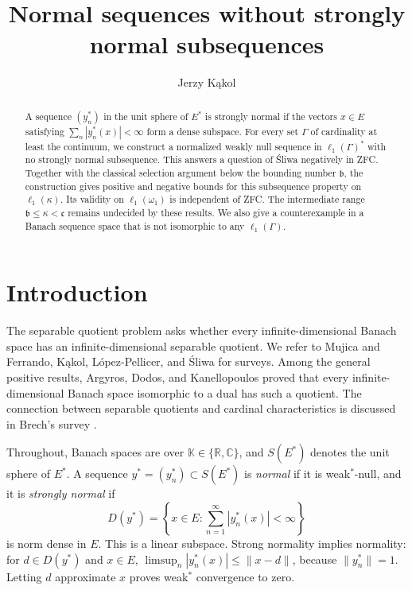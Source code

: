 \documentclass[11pt,a4paper]{amsart}
\title[Strongly normal subsequences]{Normal sequences without strongly normal subsequences}
\author{Jerzy K\k{a}kol}
\date{}
\theoremstyle{remark}
\newcommand{\K}{\mathbb K}
\begin{document}
\begin{abstract}
A sequence $(y_n^*)$ in the unit sphere of $E^*$ is strongly normal if
the vectors $x\in E$ satisfying $\sum_n|y_n^*(x)|<\infty$ form a dense
subspace. For every set $\Gamma$ of cardinality at least the continuum,
we construct a normalized weakly null sequence in $\ell_1(\Gamma)^*$
with no strongly normal subsequence. This answers a question of \'Sliwa
negatively in ZFC. Together with the classical selection argument below
the bounding number $\mathfrak b$, the construction gives positive and
negative bounds for this subsequence property on $\ell_1(\kappa)$.
Its validity on $\ell_1(\omega_1)$ is independent of ZFC. The intermediate
range $\mathfrak b\leqslant\kappa<\mathfrak c$ remains undecided by
these results. We also give a counterexample in a Banach sequence space
that is not isomorphic to any $\ell_1(\Gamma)$.
\end{abstract}

\maketitle

\section{Introduction}

The separable quotient problem asks whether every infinite-dimensional
Banach space has an infinite-dimensional separable quotient. We refer
to Mujica \cite{Mujica} and Ferrando, K\k{a}kol, L\'opez-Pellicer, and
\'Sliwa \cite{FKLS} for surveys. Among the general positive results,
Argyros, Dodos, and Kanellopoulos \cite[Theorem~15]{ADK} proved that every
infinite-dimensional Banach space isomorphic to a dual has such a quotient.
The connection between separable quotients and cardinal characteristics
is discussed in Brech's survey \cite{Brech}.

Throughout, Banach spaces are over $\K\in\{\mathbb R,\mathbb C\}$, and
$S(E^*)$ denotes the unit sphere of $E^*$. A sequence
$y^*=(y_n^*)\subset S(E^*)$ is \emph{normal} if it is weak$^*$-null,
and it is \emph{strongly normal} if
\[
 D(y^*)=\left\{x\in E:\sum_{n=1}^{\infty}|y_n^*(x)|<\infty\right\}
\]
is norm dense in $E$. This is a linear subspace. Strong normality implies
normality: for $d\in D(y^*)$ and $x\in E$,
$\limsup_n|y_n^*(x)|\leqslant\|x-d\|$, because $\|y_n^*\|=1$.
Letting $d$ approximate $x$ proves weak$^*$ convergence to zero.
\end{document}
